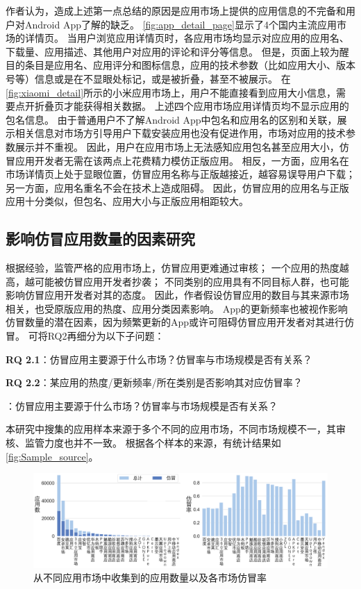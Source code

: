作者认为，造成上述第一点总结的原因是应用市场上提供的应用信息的不完备和用户对Android App了解的缺乏。
\autoref{fig:app_detail_page}显示了4个国内主流应用市场的详情页。
当用户浏览应用详情页时，各应用市场均显示对应应用的应用名、下载量、应用描述、其他用户对应用的评论和评分等信息。
但是，页面上较为醒目的条目是应用名、应用评分和图标信息，应用的技术参数（比如应用大小、版本号等）信息或是在不显眼处标记，或是被折叠，甚至不被展示。
在\autoref{fig:xiaomi_detail}所示的小米应用市场上，用户不能直接看到应用大小信息，需要点开折叠页才能获得相关数据。
上述四个应用市场应用详情页均不显示应用的包名信息。
由于普通用户不了解Android App中包名和应用名的区别和关联，展示相关信息对市场方引导用户下载安装应用也没有促进作用，市场对应用的技术参数展示并不重视。
因此，用户在应用市场上无法感知应用包名甚至应用大小，仿冒应用开发者无需在该两点上花费精力模仿正版应用。
相反，一方面，应用名在市场详情页上处于显眼位置，仿冒应用名称与正版越接近，越容易误导用户下载；另一方面，应用名重名不会在技术上造成阻碍。
因此，仿冒应用的应用名与正版应用十分类似，但包名、应用大小与正版应用相距较大。

\subsection{影响仿冒应用数量的因素研究}
\label{sec:quantitativeStudy}


根据经验，监管严格的应用市场上，仿冒应用更难通过审核；
一个应用的热度越高，越可能被仿冒应用开发者抄袭；
不同类别的应用具有不同目标人群，也可能影响仿冒应用开发者对其的态度。
因此，作者假设仿冒应用的数目与其来源市场相关，也受原版应用的热度、应用分类因素影响。
App的更新频率也被视作影响仿冒数量的潜在因素，因为频繁更新的App或许可阻碍仿冒应用开发者对其进行仿冒。
可将RQ2再细分为以下子问题：

{\bf RQ 2.1}：仿冒应用主要源于什么市场？仿冒率与市场规模是否有关系？

{\bf RQ 2.2}：某应用的热度/更新频率/所在类别是否影响其对应仿冒率？


：仿冒应用主要源于什么市场？仿冒率与市场规模是否有关系？

本研究中搜集的应用样本来源于多个不同的应用市场，不同市场规模不一，其审核、监管力度也并不一致。
根据各个样本的来源，有统计结果如\autoref{fig:Sample_source}。


\begin{figure}[htbp]
    \centering
    \setlength{\belowcaptionskip}{-10pt}
    \includegraphics[width=\textwidth]{./Figures/edwin-Number_of_samples_collected_markets_3.png}
    \caption{从不同应用市场中收集到的应用数量以及各市场仿冒率}
    \label{fig:Sample_source}
\end{figure}

